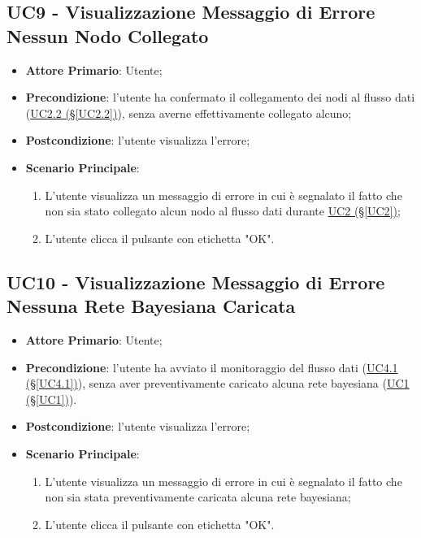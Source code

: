 \pagebreak

\subsection{UC9 - Visualizzazione Messaggio di Errore Nessun Nodo Collegato}\label{UC9}
\begin{itemize}
\item \textbf{Attore Primario}: Utente;
\item \textbf{Precondizione}: l'utente ha confermato il collegamento dei nodi al flusso dati (\hyperref[UC2.2]{UC2.2 (§\ref*{UC2.2})}), senza averne effettivamente collegato alcuno;
\item \textbf{Postcondizione}: l'utente visualizza l'errore;
\item \textbf{Scenario Principale}: 
	\begin{enumerate}
	\item L'utente visualizza un messaggio di errore in cui è segnalato il fatto che non sia stato collegato alcun 				nodo al flusso dati durante \hyperref[UC2]{UC2 (§\ref*{UC2})};
	\item L'utente clicca il pulsante con etichetta "OK".
	\end{enumerate}
\end{itemize}

\pagebreak

\subsection{UC10 - Visualizzazione Messaggio di Errore Nessuna Rete Bayesiana Caricata}\label{UC10}
\begin{itemize}
\item \textbf{Attore Primario}: Utente;
\item \textbf{Precondizione}: l'utente ha avviato il monitoraggio del flusso dati (\hyperref[UC4.1]{UC4.1 (§\ref*{UC4.1})}), senza aver preventivamente caricato alcuna rete bayesiana (\hyperref[UC1]{UC1 (§\ref*{UC1})}).
\item \textbf{Postcondizione}: l'utente visualizza l'errore;
\item \textbf{Scenario Principale}: 
	\begin{enumerate}
	\item L'utente visualizza un messaggio di errore in cui è segnalato il fatto che non sia stata preventivamente 				caricata alcuna rete bayesiana;
	\item L'utente clicca il pulsante con etichetta "OK".
	\end{enumerate}
\end{itemize}

